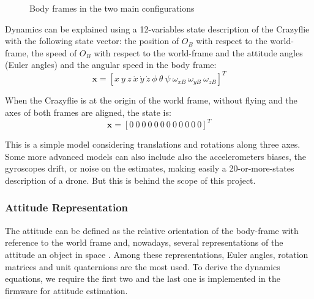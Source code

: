\documentclass[a4paper, 12pt]{report}
\begin{document}
\begin{figure}[h]
\centering
{}
\hspace{0.5cm}
\caption{Body frames in the two main configurations}
\label{fig:frames}
\end{figure}
  
Dynamics can be explained using a 12-variables state description of the Crazyflie with the following state vector: the position of $O_B$ with respect to the world-frame, the speed of $O_B$ with respect to the world-frame and  the attitude angles (Euler angles) and the angular speed in the body frame:
 \[\boldsymbol{x} =  [x \ y \ z \ \dot x \ \dot y \ \dot z \ \phi \ \theta \ \psi \ \omega_{xB} \ \omega_{yB} \ \omega_{zB}]^T \]

When the Crazyflie is at the origin of the world frame, without flying and the axes of both frames are aligned, the state is:
 \[\boldsymbol{x} =  [0 \ 0 \ 0 \ 0 \ 0 \ 0 \ 0 \ 0 \ 0 \ 0 \ 0 \ 0 ]^T\]
 
This is a simple model considering translations and rotations along three axes. Some more advanced models can also include also the accelerometers biases, the gyroscopes drift, or noise on the estimates, making easily a 20-or-more-states description of a drone. But this is behind the scope of this project.

\subsubsection{Attitude Representation}
The attitude can be defined as the relative orientation of the body-frame with reference to the world frame and, nowadays, several representations of the attitude  an object in space \cite{Diebel2006}. Among these representations, Euler angles, rotation matrices and unit quaternions are the most used. To derive the dynamics equations, we require the first two and the last one is implemented in the firmware for attitude estimation.
\end{document}
